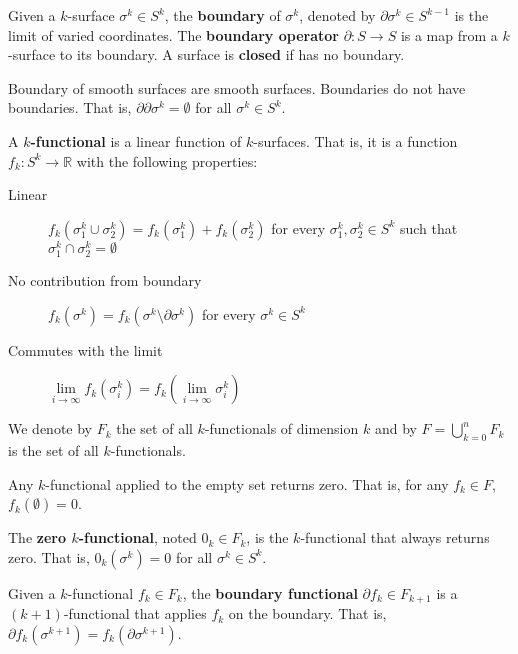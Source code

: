 \begin{defn}
	Given a $k$-surface $\sigma^k \in S^k$, the \textbf{boundary} of $\sigma^k$, denoted by $\partial\sigma^k \in S^{k-1}$ is the limit of varied coordinates. The \textbf{boundary operator} $\partial : S \to S$ is a map from a $k$-surface to its boundary. A surface is \textbf{closed} if has no boundary.
\end{defn}

\begin{coro}
	Boundary of smooth surfaces are smooth surfaces. Boundaries do not have boundaries. That is, $\partial\partial \sigma^k = \emptyset$ for all $\sigma^k \in S^k$.
\end{coro}


\begin{defn}
	A \textbf{$k$-functional} is a linear function of $k$-surfaces. That is, it is a function $f_k : S^k \to \mathbb{R}$ with the following properties:
	\begin{description}
		\item[Linear] $f_k(\sigma^k_1 \cup \sigma^k_2) = f_k(\sigma^k_1) + f_k(\sigma^k_2)$ for every $\sigma^k_1, \sigma^k_2 \in S^k$ such that $\sigma^k_1 \cap \sigma^k_2 = \emptyset$
		\item[No contribution from boundary] $f_k(\sigma^k) = f_k(\sigma^k \setminus \partial \sigma^k)$ for every $\sigma^k \in S^k$
		\item[Commutes with the limit] $\lim\limits_{i \to \infty} f_k(\sigma_i^k) = f_k(\lim\limits_{i \to \infty}\sigma_i^k)$
	\end{description}
	We denote by $F_k$ the set of all $k$-functionals of dimension $k$ and by $F = \bigcup_{k=0}^nF_k$ is the set of all $k$-functionals.
\end{defn}

\begin{coro}
	Any $k$-functional applied to the empty set returns zero. That is, for any $f_k \in F$, $f_k(\emptyset) = 0$.
\end{coro}

\begin{defn}
	The \textbf{zero $k$-functional}, noted $0_k \in F_k$, is the $k$-functional that always returns zero. That is, $0_k(\sigma^k) = 0$ for all $\sigma^k \in S^k$.
\end{defn}


\begin{defn}
	Given a $k$-functional $f_k \in F_k$, the \textbf{boundary functional} $\partial f_k \in F_{k+1}$ is a $(k+1)$-functional that applies $f_k$ on the boundary. That is, $\partial f_k(\sigma^{k+1}) = f_k(\partial \sigma^{k+1})$. 
\end{defn}

